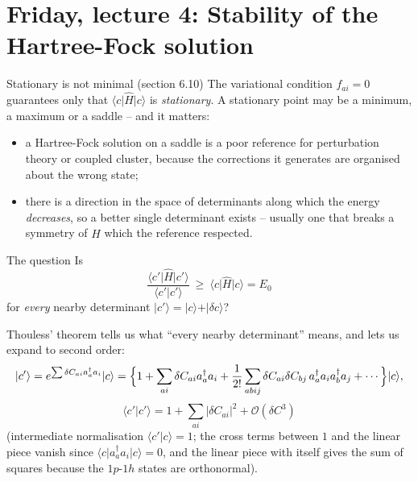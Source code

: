 \documentclass[aspectratio=169,10pt]{beamer}
\newcommand{\ket}[1]{\vert #1\rangle}
\newcommand{\braket}[2]{\langle #1\vert #2\rangle}
\newcommand{\element}[3]{\langle #1\vert #2\vert #3\rangle}
\newcommand{\bigO}{\mathcal{O}}
\begin{document}
\section{Friday, lecture 4: Stability of the Hartree-Fock solution}

\begin{frame}[shrink=4]{Stationary is not minimal (section 6.10)}
  \footnotesize
  The variational condition $f_{ai}=0$ guarantees only that $\element{c}{\hat{H}}{c}$ is \emph{stationary}. A stationary point may be a minimum, a maximum or a saddle -- and it matters:
  \begin{itemize}
    \item a Hartree-Fock solution on a saddle is a poor reference for perturbation theory or coupled cluster, because the corrections it generates are organised about the wrong state;
    \item there is a direction in the space of determinants along which the energy \emph{decreases}, so a better single determinant exists -- usually one that breaks a symmetry of $\hat{H}$ which the reference respected.
  \end{itemize}
  \begin{block}{The question}
    Is
    \[
      \frac{\element{c'}{\hat{H}}{c'}}{\braket{c'}{c'}}\ \ge\ \element{c}{\hat{H}}{c}=E_0
    \]
    for \emph{every} nearby determinant $\ket{c'}=\ket{c}+\ket{\delta c}$?
  \end{block}
  Thouless' theorem tells us what ``every nearby determinant'' means, and lets us expand to second order:
  \[
    \ket{c'}=e^{\sum\delta C_{ai}a_a^{\dagger}a_i}\ket{c}
    =\Bigl\{1+\sum_{ai}\delta C_{ai}a_a^{\dagger}a_i+\frac{1}{2!}\sum_{abij}\delta C_{ai}\delta C_{bj}\,a_a^{\dagger}a_ia_b^{\dagger}a_j+\cdots\Bigr\}\ket{c},
  \]
  \vspace{-0.8em}
  \[
    \braket{c'}{c'}=1+\sum_{ai}|\delta C_{ai}|^2+\bigO(\delta C^3)
  \]
  (intermediate normalisation $\braket{c'}{c}=1$; the cross terms between $1$ and the linear piece vanish since $\element{c}{a_a^{\dagger}a_i}{c}=0$, and the linear piece with itself gives the sum of squares because the $1p$-$1h$ states are orthonormal).
\end{frame}
\end{document}
